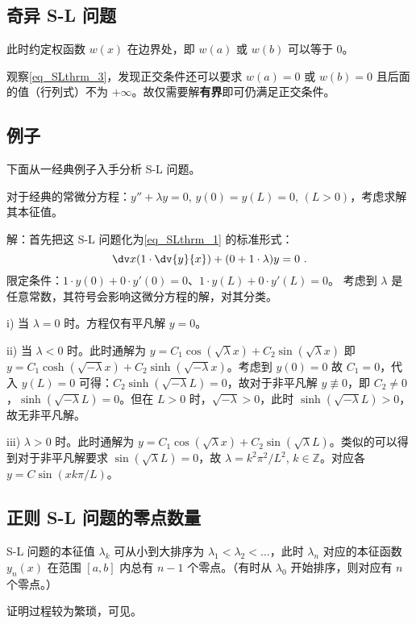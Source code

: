 \subsection{奇异 S-L 问题}
此时约定权函数 $w(x)$ 在边界处，即 $w(a)$ 或 $w(b)$ 可以等于 $0$。

观察\autoref{eq_SLthrm_3}，发现正交条件还可以要求 $w(a) = 0$ 或 $w(b) = 0$ 且后面的值（行列式）不为 $+\infty$。故仅需要解\textbf{有界}即可仍满足正交条件。



\subsection{例子}
下面从一经典例子入手分析 S-L 问题。

\begin{example}{}
对于经典的常微分方程：$y'' + \lambda y = 0$, $y(0) = y(L) = 0$, $(L > 0)$，考虑求解其本征值。
\end{example}
解：首先把这 S-L 问题化为\autoref{eq_SLthrm_1} 的标准形式：
$$\dv x (1 \cdot \dv{y}{x}) + (0 + 1 \cdot \lambda) y = 0~.$$
限定条件：$ 1\cdot y(0) + 0 \cdot y'(0) = 0$、$1 \cdot y(L) + 0 \cdot y'(L) = 0$。
考虑到 $\lambda$ 是任意常数，其符号会影响这微分方程的解，对其分类。

i) 当 $\lambda = 0$ 时。方程仅有平凡解 $y = 0$。

ii) 当 $\lambda < 0$ 时。此时通解为 $y = C_1 \cos(\sqrt{\lambda} x) + C_2 \sin(\sqrt{\lambda} x)$ 即 $y= C_1 \cosh(\sqrt{-\lambda} x) + C_2 \sinh(\sqrt{-\lambda} x)$。考虑到 $y(0)=0$ 故 $C_1 = 0$，代入 $y(L) = 0$ 可得：$C_2 \sinh(\sqrt{-\lambda} L) = 0$，故对于非平凡解 $y \not \equiv 0$，即 $C_2 \neq 0$，$\sinh(\sqrt{-\lambda} L) = 0$。但在 $L>0$ 时，$\sqrt{-\lambda} > 0$，此时 $\sinh(\sqrt{-\lambda} L) > 0$，故无非平凡解。

iii) $\lambda > 0$ 时。此时通解为 $y = C_1 \cos(\sqrt{\lambda} x) + C_2 \sin(\sqrt{\lambda} L)$。类似的可以得到对于非平凡解要求 $\sin(\sqrt \lambda L) = 0$，故 $\lambda = k^2 \pi^2/L^2$, $k \in \mathbb Z$。对应各 $y = C \sin(x k\pi/L )$。

\subsection{正则 S-L 问题的零点数量}
S-L 问题的本征值 $\lambda_k$ 可从小到大排序为 $\lambda_1 < \lambda_2 < \dots$，此时 $\lambda_n$ 对应的本征函数 $y_n(x)$ 在范围 $[a, b]$ 内总有 $n-1$ 个零点。（有时从 $\lambda_0$ 开始排序，则对应有 $n$ 个零点。）

证明过程较为繁琐，可见。